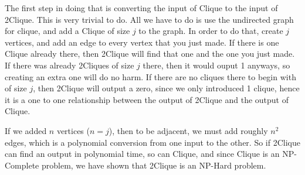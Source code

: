 \documentclass{article}
\begin{document}
\begin{enumerate}
The first step in doing that is converting the input of Clique to the input of 2Clique. This is very trivial to do. All we have to do is use the undirected graph for clique, and add a Clique of size $j$ to the graph. In order to do that, create $j$ vertices, and add an edge to every vertex that you just made. If there is one Clique already there, then 2Clique will find that one and the one you just made. If there was already 2Cliques of size $j$ there, then it would ouput 1 anyways, so creating an extra one will do no harm. If there are no cliques there to begin with of size $j$, then 2Clique will output a zero, since we only introduced 1 clique, hence it is a one to one relationship between the output of 2Clique and the output of Clique. 

If we added $n$ vertices ($n = j$), then to be adjacent, we must add roughly $n^2$ edges, which is a polynomial conversion from one input to the other. So if 2Clique can find an output in polynomial time, so can Clique, and since Clique is an NP-Complete problem, we have shown that 2Clique is an NP-Hard problem.
\end{enumerate}
\end{document}
